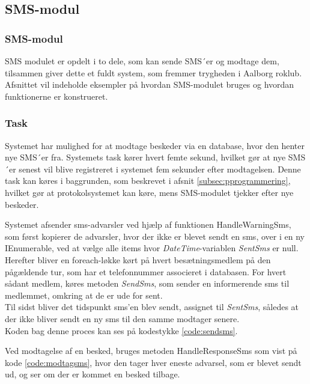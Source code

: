 \subsection{SMS-modul}
\label{sec:imple_sms}

\subsubsection{SMS-modul}
SMS modulet er opdelt i to dele, som kan sende SMS´er og modtage dem, tilsammen giver dette et fuldt system, som fremmer trygheden i Aalborg roklub. Afsnittet vil indeholde eksempler på hvordan SMS-modulet bruges og hvordan funktionerne er konstrueret.

\subsubsection{Task}
Systemet har mulighed for at modtage beskeder via en database, hvor den henter nye SMS´er fra.
Systemets task kører hvert femte sekund, hvilket gør at nye SMS´er senest vil blive registreret i systemet fem sekunder efter modtagelsen. Denne task kan køres i baggrunden, som beskrevet i afsnit \ref{subsec:pprogrammering}, hvilket gør at protokolsystemet kan køre, mens SMS-modulet tjekker efter nye beskeder.

Systemet afsender sms-advarsler ved hjælp af funktionen HandleWarningSms, som først kopierer de advarsler, hvor der ikke er blevet sendt en sms, over i en ny IEnumerable, ved at vælge alle items hvor \textit{DateTime}-variablen \textit{SentSms} er null.\\

Herefter bliver en foreach-løkke kørt på hvert besætningsmedlem på den pågældende tur, som har et telefonnummer associeret i databasen. For hvert sådant medlem, køres metoden \textit{SendSms}, som sender en informerende sms til medlemmet, omkring at de er ude for sent.\\

Til sidst bliver det tidspunkt sms'en blev sendt, assignet til \textit{SentSms}, således at der ikke bliver sendt en ny sms til den samme modtager senere.\\

Koden bag denne proces kan ses på kodestykke \ref{code:sendsms}.


Ved modtagelse af en besked, bruges metoden HandleResponseSms som vist på kode \ref{code:modtagsms}, hvor den tager hver eneste advarsel, som er blevet sendt ud, og ser om der er kommet en besked tilbage.\\

